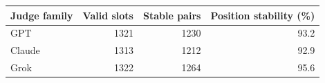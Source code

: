 \begin{tabular}{lrrr}
\toprule
Judge family & Valid slots & Stable pairs & Position stability (\%)\\
\midrule
GPT & 1321 & 1230 & 93.2\\
Claude & 1313 & 1212 & 92.9\\
Grok & 1322 & 1264 & 95.6\\
\bottomrule
\end{tabular}
